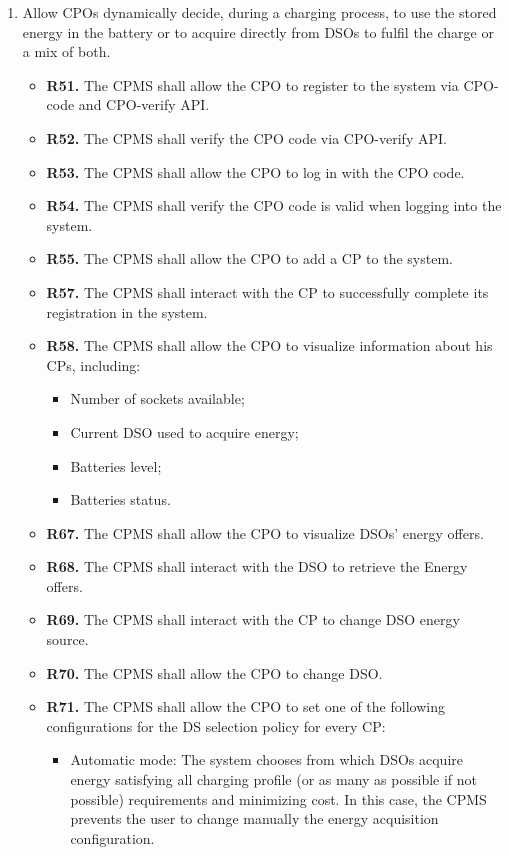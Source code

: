 \documentclass{Configuration_Files/PoliMi3i_thesis}
\begin{document}
\begin{enumerate}[label=\textbf{G\arabic*}]
    \item Allow CPOs dynamically decide, during a charging process, to use the stored energy in the battery or to acquire directly from DSOs to fulfil the charge or a mix of both.
        \begin{itemize}
            \item \textbf{R51.} The CPMS shall allow the CPO to register to the system via CPO-code and CPO-verify API.
            \item \textbf{R52.} The CPMS shall verify the CPO code via CPO-verify API.
            \item \textbf{R53.} The CPMS shall allow the CPO to log in with the CPO code.
            \item \textbf{R54.} The CPMS shall verify the CPO code is valid when logging into the system.
            \item \textbf{R55.} The CPMS shall allow the CPO to add a CP to the system.
            \item \textbf{R57.} The CPMS shall interact with the CP to successfully complete its registration in the system.
            \item \textbf{R58.} The CPMS shall allow the CPO to visualize information about his CPs, including:
                \begin{itemize}
                    \item Number of sockets available;
                    \item Current DSO used to acquire energy;
                    \item Batteries level;
                    \item Batteries status.
                \end{itemize}
            \item \textbf{R67.} The CPMS shall allow the CPO to visualize DSOs' energy offers.
            \item \textbf{R68.} The CPMS shall interact with the DSO to retrieve the Energy offers.
            \item \textbf{R69.} The CPMS shall interact with the CP to change DSO energy source.
            \item \textbf{R70.} The CPMS shall allow the CPO to change DSO.
            \item \textbf{R71.} The CPMS shall allow the CPO to set one of the following configurations for the DS selection policy for every CP:
                \begin{itemize}
                    \item Automatic mode: The system chooses from which DSOs acquire energy satisfying all charging profile (or as many as possible if not possible) requirements and minimizing cost. In this case, the CPMS prevents the user to change manually the energy acquisition configuration.

\end{itemize}
\end{itemize}
\end{enumerate}
\end{document}
